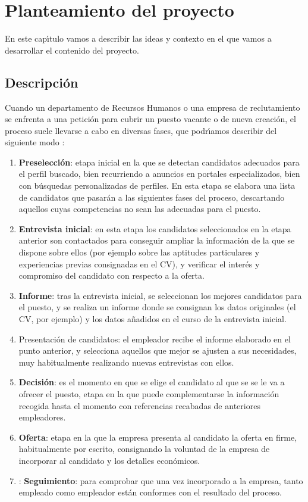 \documentclass[11pt,a4paper,leqno,titlepage,twoside]{book}
\begin{document}
\chapter{Planteamiento del proyecto}

En este cap\'\i tulo vamos a describir las ideas y contexto en el que vamos a desarrollar el contenido del proyecto.

\section{Descripci\'on}
Cuando un departamento de Recursos Humanos o una empresa de reclutamiento se enfrenta a una petici\'on para
cubrir un puesto vacante o de nueva creaci\'on, el proceso suele llevarse a cabo en diversas fases, que 
podr\'\i amos describir del siguiente modo \cite{proceso_seleccion1}:
\begin{enumerate}
\item {\bf Preselección}: etapa inicial en la que se detectan candidatos adecuados para el perfil buscado, bien recurriendo a 
anuncios en portales especializados, bien con b\'usquedas personalizadas de perfiles. En esta etapa se elabora una lista 
de candidatos que pasar\'an a las siguientes fases del proceso, descartando aquellos cuyas competencias no sean las adecuadas
para el puesto. 
\item {\bf Entrevista inicial}: en esta etapa los candidatos seleccionados en la etapa anterior son contactados para  
conseguir ampliar la informaci\'on de la que se dispone sobre ellos  (por ejemplo sobre las aptitudes
particulares y experiencias previas consignadas en el CV), y verificar el inter\'es y compromiso del candidato
con respecto a la oferta.
\item {\bf Informe}: tras la entrevista inicial, se seleccionan los mejores candidatos para el puesto, y se realiza un informe
donde se consignan los datos originales (el CV, por ejemplo) y los datos a\~nadidos en el curso de la entrevista inicial.
\item Presentaci\'on de candidatos: el empleador recibe el informe elaborado en el punto anterior, y selecciona aquellos
que mejor se ajusten a sus necesidades, muy habitualmente realizando nuevas entrevistas con ellos.
\item {\bf Decisi\'on}: es el momento en que se elige el candidato al que se se le va a ofrecer el puesto, etapa en la 
que puede complementarse la informaci\'on recogida hasta el momento con referencias recabadas de anteriores empleadores.
\item {\bf Oferta}: etapa en la que la empresa presenta al candidato la oferta en firme, habitualmente por escrito, consignando 
la voluntad de la empresa de incorporar al candidato y los detalles econ\'omicos. 
\item: {\bf Seguimiento}:  para comprobar que una vez incorporado a la empresa, tanto empleado como empleador est\'an conformes con
el resultado del proceso.
\end{enumerate}
\end{document}

